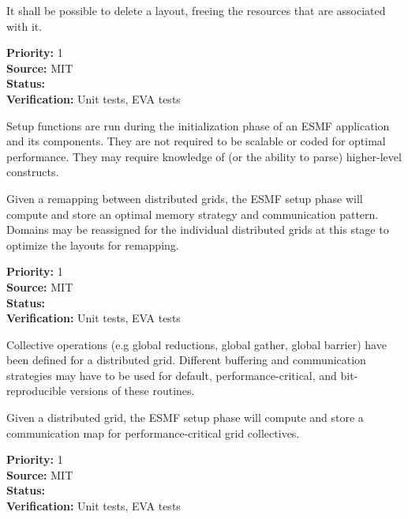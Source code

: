 It shall be possible to delete a layout, freeing the resources that 
are associated with it.

\begin{reqlist}
  {\bf Priority:} 1 \\
  {\bf Source:}  MIT \\
  {\bf Status:}  \\
  {\bf Verification:} Unit tests, EVA tests \\
\end{reqlist}


Setup functions are run during the initialization phase of an ESMF
application and its components. They are not required to be scalable
or coded for optimal performance. They may require knowledge of (or
the ability to parse) higher-level constructs.


Given a remapping between distributed grids, the ESMF setup
phase will compute and store an optimal memory strategy and
communication pattern. Domains may be reassigned for the individual
distributed grids at this stage to optimize the layouts for remapping.

\begin{reqlist}
{\bf Priority:} 1 \\
{\bf Source:}  MIT \\
{\bf Status:}  \\
{\bf Verification:} Unit tests, EVA tests \\
\end{reqlist}


Collective operations (e.g global reductions, global gather, global
barrier) have been defined for a distributed grid. Different
buffering and communication strategies may have to be used for
default, performance-critical, and bit-reproducible versions of these
routines.


Given a distributed grid, the ESMF setup
phase will compute and store a communication map for
performance-critical grid collectives.

\begin{reqlist}
{\bf Priority:} 1 \\
{\bf Source:}  MIT \\
{\bf Status:}  \\
{\bf Verification:} Unit tests, EVA tests \\
\end{reqlist}

